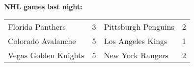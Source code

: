 \textbf{NHL games last night:}
\begin{tabular}{llll}
\toprule
    Florida Panthers & 3 & Pittsburgh Penguins & 2 \\
  Colorado Avalanche & 5 &   Los Angeles Kings & 1 \\
Vegas Golden Knights & 5 &    New York Rangers & 2 \\
\bottomrule
\end{tabular}
